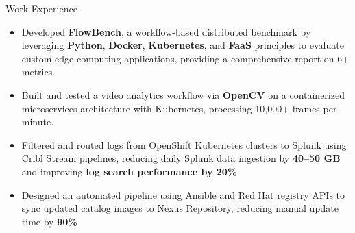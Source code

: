 \documentclass{resume}
\begin{document}
 \begin{experienceSection}{Work Experience}
    \experienceItem[
        company={Arizona State University},
        location={Remote},
        position={Research Assistant, VISA Lab},
        duration={Jun 2025 - Present}
    ]
    \begin{itemize}
        \itemsep -6pt {}
        \item Developed \textbf{FlowBench}, a workflow-based distributed benchmark by leveraging \textbf{Python}, \textbf{Docker}, \textbf{Kubernetes}, and \textbf{FaaS} principles to evaluate custom edge computing applications, providing a comprehensive report on 6+ metrics.
        \item Built and tested a video analytics workflow via \textbf{OpenCV} on a containerized microservices architecture with Kubernetes, processing 10,000+ frames per minute.
    \end{itemize}

    \experienceItem[
        company={Arch Mortgage Insurance},
        location={Greensboro, NC},
        position={Site Reliability Engineer (SRE) Intern},
        duration={Jun 2024 - Aug 2024}
    ]
    \begin{itemize}
        \itemsep -6pt {}
        \item Filtered and routed logs from OpenShift Kubernetes clusters to Splunk using Cribl Stream pipelines, reducing daily Splunk data ingestion by \textbf{40–50 GB} and improving \textbf{log search performance by 20\%}
        \item Designed an automated pipeline using Ansible and Red Hat registry APIs to sync updated catalog images to Nexus Repository, reducing manual update time by \textbf{ 90\%}
        
    \end{itemize}


\end{experienceSection}
\end{document}
